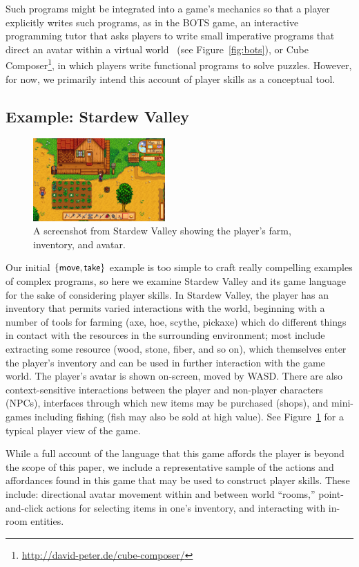 Such programs might be integrated into a game's mechanics so that a player
explicitly writes such programs, as in the BOTS game, an interactive
programming tutor that asks players to write small imperative programs that
direct an avatar within a virtual world~\cite{hicks2012creation} (see
Figure~\ref{fig:bots}), or Cube
Composer\footnote{\url{http://david-peter.de/cube-composer/}}, in which
players write functional programs to solve puzzles. However, for now, we
primarily intend this account of player skills as a conceptual tool.

\subsection{Example: Stardew Valley}

\begin{figure}
  \includegraphics[width=0.45\textwidth]{stardew-valley.png}
  \caption{A screenshot from Stardew Valley showing the player's farm,
  inventory, and avatar.}
  \label{fig:stardew}
\end{figure}

Our initial $\{\mathsf{move}, \mathsf{take}\}$ example is too simple to craft really
compelling examples of complex programs, so here we examine
Stardew Valley and its game language for the sake of considering player
skills. In Stardew Valley, the player has an inventory that permits varied
interactions with the world, beginning with a number of tools for farming (axe,
hoe, scythe, pickaxe) which do different things in contact with the
resources in the surrounding environment; most include extracting some
resource (wood, stone, fiber, and so on), which themselves enter the
player's inventory and can be used in further interaction with the game
world. The player's avatar is shown on-screen, moved by WASD.  There are
also context-sensitive interactions between the player and non-player
characters (NPCs), interfaces through which new items may be purchased
(shops), and mini-games including fishing (fish may also be sold at high
value). See Figure~\ref{fig:stardew} for a typical player view of the game.

While a full account of the language that this game affords the player is
beyond the scope of this paper, we include a representative sample of the
actions and affordances found in this game that may be used to construct
player skills.
These include: directional avatar movement within and between
world ``rooms,'' point-and-click actions for selecting items in
one's inventory, and interacting with in-room entities. 

